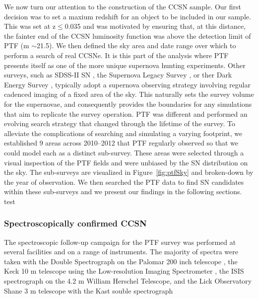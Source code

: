 \documentclass[a4paper,fleqn,usenatbib]{mnras}
\begin{document}
We now turn our attention to the construction of the CCSN sample. Our first decision was to set a maxium redshift for an object to be included in our sample. This was set at z${\le}$0.035 and was motivated by ensuring that, at this distance, the fainter end of the CCSN luminosity function \citep{2011MNRAS.412.1441L} was above the detection limit of PTF (m ${\sim}$21.5). We then defined the sky area and date range over which to perform a search of real CCSNe. It is this part of the analysis where PTF presents itself as one of the more unique supernova hunting experiments. Other surveys, such as SDSS-II SN \citep{2008AJ....135..338F}, the Supernova Legacy Survey \citep[SNLS;][]{2006A&A...447...31A}, or ther Dark Energy Survey \citep[DES;][]{DES2005}, typically adopt a supernova observing strategy involving regular cadenced imaging of a fixed area of the sky. This naturally sets the survey volume for the supernovae, and consequently provides the boundaries for any simulations that aim to replicate the survey operation. PTF was different and performed an evolving search strategy that changed through the lifetime of the survey. To alleviate the complications of searching and simulating a varying footprint, we established 9 areas across 2010--2012 that PTF regularly observed so that we could model each as a distinct sub-survey. These areas were selected through a visual inspection of the PTF fields and were unbiased by the SN distribution on the sky. The sub-surveys are visualized in Figure~\ref{fig:ptfSky} and broken-down by the year of observation. We then searched the PTF data to find SN candidates within these sub-surveys and we present our findings in the following sections. test

\subsubsection{Spectroscopically confirmed CCSN}
\label{sec:spec_CC}

The spectroscopic follow-up campaign for the PTF survey was performed at several facilities and on a range of instruments. The majority of spectra were taken with the Double Spectrograph on the Palomar 200 inch telescope \citep{1982PASP...94..586O}, the Keck 10 m telescope using the Low-resolution Imaging Spectrometer \citep[LIRS;][]{1995PASP..107..375O}, the ISIS spectrograph on the 4.2 m William Herschel Telescope, and the Lick Observatory Shane 3 m telescope with the Kast souble spectrograph \citep{miller_lick_1993}
\end{document}
